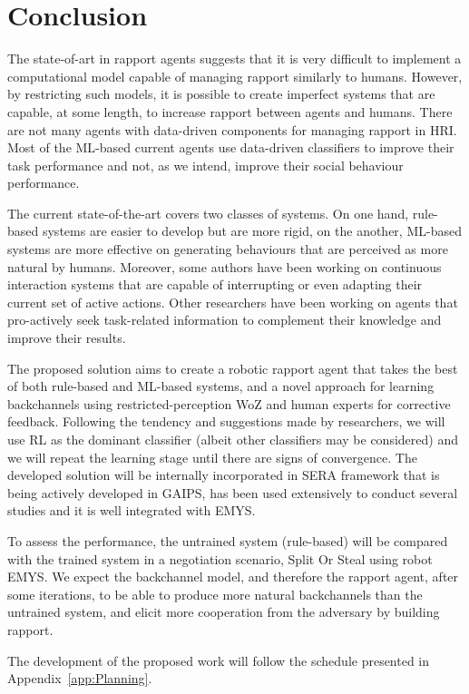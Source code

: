 \section{Conclusion}
\label{sec:Conclusion}

The state-of-art in rapport agents suggests that it is very difficult to implement a computational model capable of managing rapport similarly to humans. However, by restricting such models, it is possible to create imperfect systems that are capable, at some length, to increase rapport between agents and humans. There are not many agents with data-driven components for managing rapport in \acl{HRI}. Most of the \ac{ML}-based current agents use data-driven classifiers to improve their task performance and not, as we intend, improve their social behaviour performance.

The current state-of-the-art covers two classes of systems. On one hand, rule-based systems are easier to develop but are more rigid, on the another, \ac{ML}-based systems are more effective on generating behaviours that are perceived as more natural by humans. Moreover, some authors have been working on continuous interaction systems that are capable of interrupting or even adapting their current set of active actions. Other researchers have been working on agents that pro-actively seek task-related information to complement their knowledge and improve their results.

The proposed solution aims to create a robotic rapport agent that takes the best of both rule-based and \ac{ML}-based systems, and a novel approach for learning backchannels using restricted-perception \ac{WoZ} and human experts for corrective feedback. Following the tendency and suggestions made by researchers, we will use \ac{RL} as the dominant classifier (albeit other classifiers may be considered) and we will repeat the learning stage until there are signs of convergence. The developed solution will be internally incorporated in \ac{SERA} framework that is being actively developed in \ac{GAIPS}, has been used extensively to conduct several studies and it is well integrated with \ac{EMYS}.

To assess the performance, the untrained system (rule-based) will be compared with the trained system in a negotiation scenario, Split Or Steal using robot \ac{EMYS}. We expect the backchannel model, and therefore the rapport agent, after some iterations, to be able to produce more natural backchannels than the untrained system, and elicit more cooperation from the adversary by building rapport.

The development of the proposed work will follow the schedule presented in Appendix~\ref{app:Planning}.